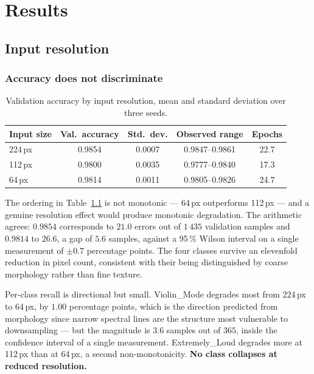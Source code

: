 \chapter{Results}
\label{ch:results}

\section{Input resolution}
\label{sec:resolution}

\subsection{Accuracy does not discriminate}

\begin{table}[htbp]
\centering
\begin{tabular}{lcccc}
\toprule
Input size & Val.\ accuracy & Std.\ dev. & Observed range & Epochs \\
\midrule
224\,px & 0.9854 & 0.0007 & 0.9847--0.9861 & 22.7 \\
112\,px & 0.9800 & 0.0035 & 0.9777--0.9840 & 17.3 \\
64\,px  & 0.9814 & 0.0011 & 0.9805--0.9826 & 24.7 \\
\bottomrule
\end{tabular}
\caption{Validation accuracy by input resolution, mean and standard deviation
over three seeds.}
\label{tab:resolution-accuracy}
\end{table}

The ordering in Table~\ref{tab:resolution-accuracy} is not monotonic --- 64\,px
outperforms 112\,px --- and a genuine resolution effect would produce monotonic
degradation. The arithmetic agrees: $0.9854$ corresponds to $21.0$ errors out of
$1\,435$ validation samples and $0.9814$ to $26.6$, a gap of $5.6$ samples,
against a 95\,\% Wilson interval on a single measurement of $\pm 0.7$ percentage
points. The four classes survive an elevenfold reduction in pixel count,
consistent with their being distinguished by coarse morphology rather than fine
texture.

Per-class recall is directional but small. Violin\_Mode degrades most from
224\,px to 64\,px, by $1.00$ percentage points, which is the direction predicted
from morphology since narrow spectral lines are the structure most vulnerable to
downsampling --- but the magnitude is $3.6$ samples out of $365$, inside the
confidence interval of a single measurement. Extremely\_Loud degrades more at
112\,px than at 64\,px, a second non-monotonicity. \textbf{No class collapses at
reduced resolution.}

